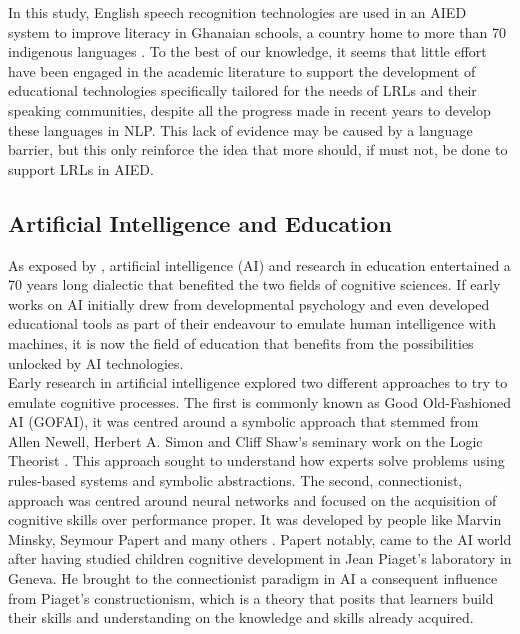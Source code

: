 In this study, English speech recognition technologies are used in an AIED system to improve literacy in Ghanaian schools, a country home to more than 70 indigenous languages \parencite{noauthor_ghana_nodate}.
To the best of our knowledge, it seems that little effort have been engaged in the academic literature to support the development of educational technologies specifically tailored for the needs of LRLs and their speaking communities, despite all the progress made in recent years to develop these languages in NLP. This lack of evidence may be caused by a language barrier, but this only reinforce the idea that more should, if must not, be done to support LRLs in AIED.

    \subsection{Artificial Intelligence and Education}
As exposed by \textcite{doroudi_intertwined_2023}, artificial intelligence (AI) and research in education entertained a 70 years long dialectic that benefited the two fields of cognitive sciences. If early works on AI initially drew from developmental psychology and even developed educational tools as part of their endeavour to emulate human intelligence with machines, it is now the field of education that benefits from the possibilities unlocked by AI technologies.\\
Early research in artificial intelligence explored two different approaches to try to emulate cognitive processes. The first is commonly known as Good Old-Fashioned AI (GOFAI), it was centred around a symbolic approach that stemmed from Allen Newell, Herbert A. Simon and Cliff Shaw's seminary work on the Logic Theorist \parencite{newell_logic_1956}. This approach sought to understand how experts solve problems using rules-based systems and symbolic abstractions. The second, connectionist, approach was centred around neural networks and focused on the acquisition of cognitive skills over performance proper. It was developed by people like Marvin Minsky, Seymour Papert and many others \parencite{doroudi_intertwined_2023}. Papert notably, came to the AI world after having studied children cognitive development in Jean Piaget's laboratory in Geneva. He brought to the connectionist paradigm in AI a consequent influence from Piaget's constructionism, which is a theory that posits that learners build their skills and understanding on the knowledge and skills already acquired.\\

